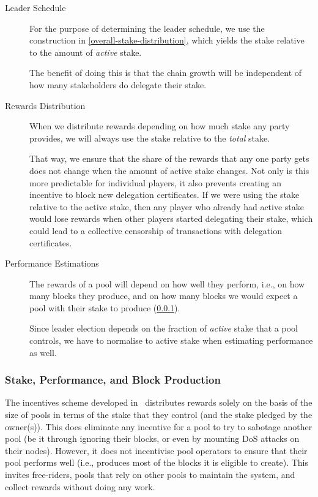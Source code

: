 \documentclass[11pt,a4paper,dvipsnames,twosided]{article}
\newcommand{\citep}[1]{\cite{#1}}
\begin{document}
\begin{description}
\item[Leader Schedule] For the purpose of determining the leader schedule, we
  use the construction in \cref{overall-stake-distribution}, which yields the
  stake relative to the amount of \emph{active} stake.

  The benefit of doing this is that the chain growth will be independent of how
  many stakeholders do delegate their stake.
\item[Rewards Distribution] When we distribute rewards depending on how much
  stake any party provides, we will always use the stake relative to the
  \emph{total} stake.

  That way, we ensure that the share of the rewards that any one party gets does
  not change when the amount of active stake changes. Not only is this more
  predictable for individual players, it also prevents creating an incentive to
  block new delegation certificates. If we were using the stake relative to the
  active stake, then any player who already had active stake would lose rewards
  when other players started delegating their stake, which could lead to a
  collective censorship of transactions with delegation certificates.
\item[Performance Estimations] The rewards of a pool will depend on how well
  they perform, i.e., on how many blocks they produce, and on how many blocks we
  would expect a pool with their stake to produce
  (\cref{stake-performance-and-block-production}).

  Since leader election depends on the fraction of \emph{active} stake that a
  pool controls, we have to normalise to active stake when estimating
  performance as well.
\end{description}

\subsubsection{Stake, Performance, and Block Production}
\label{stake-performance-and-block-production}

The incentives scheme developed in~\citep{bkks2018} distributes rewards solely
on the basis of the size of pools in terms of the stake that they control (and
the stake pledged by the owner(s)). This does eliminate any incentive for a pool
to try to sabotage another pool (be it through ignoring their blocks, or even by
mounting DoS attacks on their nodes). However, it does not incentivise pool
operators to ensure that their pool performs well (i.e., produces most of the
blocks it is eligible to create). This invites free-riders, pools that rely on
other pools to maintain the system, and collect rewards without doing any work.
\end{document}
